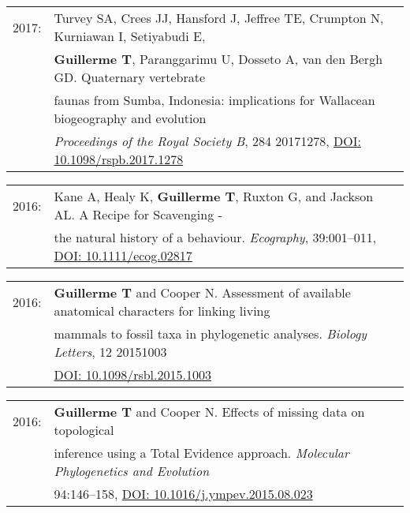 \documentclass[10pt,a4paper]{article}
\begin{document}
{\bigskip

\begin{tabular}{ll}
2017: & Turvey SA, Crees JJ, Hansford J, Jeffree TE, Crumpton N, Kurniawan I, Setiyabudi E,\\
      & \textbf{Guillerme T}, Paranggarimu U, Dosseto A, van den Bergh GD. Quaternary vertebrate\\
      & faunas from Sumba, Indonesia: implications for Wallacean biogeography and evolution \\
      & \textit{Proceedings of the Royal Society B}, 284 20171278, \href{http://rspb.royalsocietypublishing.org/content/284/1861/20171278}{DOI: 10.1098/rspb.2017.1278}\\ %
\end{tabular}

\bigskip

\begin{tabular}{ll}
2016: & Kane A, Healy K, \textbf{Guillerme T}, Ruxton G, and Jackson AL. A Recipe for Scavenging -\\
      & the natural history of a behaviour. \textit{Ecography}, 39:001–011, \href{http://onlinelibrary.wiley.com/doi/10.1111/ecog.02817/abstract}{DOI: 10.1111/ecog.02817}\\ %
\end{tabular}

\bigskip

\begin{tabular}{ll}
2016: &\textbf{Guillerme T} and Cooper N. Assessment of available anatomical characters for linking living\\
      & mammals to fossil taxa in phylogenetic analyses. \textit{Biology Letters}, 12 20151003\\
      & \href{http://rsbl.royalsocietypublishing.org/content/12/5/20151003}{DOI: 10.1098/rsbl.2015.1003}\\ %
\end{tabular}

\bigskip

\begin{tabular}{ll}
2016: & \textbf{Guillerme T} and Cooper N. Effects of missing data on topological\\
      & inference using a Total Evidence approach. \textit{Molecular Phylogenetics and Evolution}\\
      & 94:146–158, \href{http://goo.gl/bVGrQJ}{DOI: 10.1016/j.ympev.2015.08.023}\\
\end{tabular}

}
\end{document}
